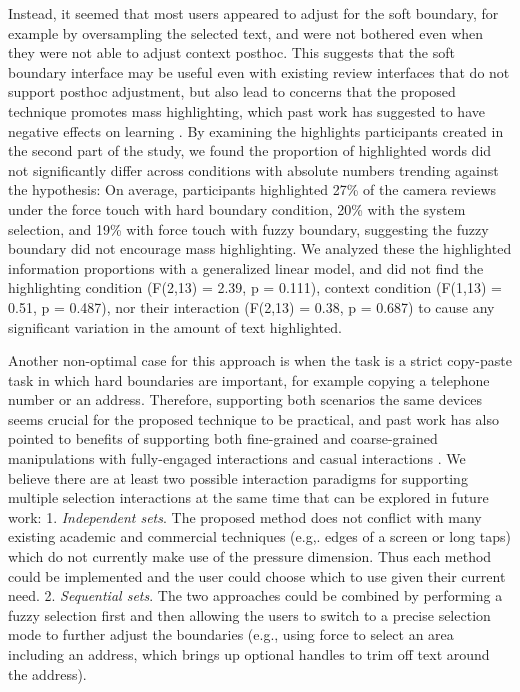 Instead, it seemed that most users appeared to adjust for the soft boundary, for example by oversampling the selected text, and were not bothered even when they were not able to adjust context posthoc.  This suggests that the soft boundary interface may be useful even with existing review interfaces that do not support posthoc adjustment, but also lead to concerns that the proposed technique promotes mass highlighting, which past work has suggested to have negative effects on learning \cite{peterson1991cognitive}. By examining the highlights participants created in the second part of the study, we found the proportion of highlighted words did not significantly differ across conditions with absolute numbers trending against the hypothesis: On average, participants highlighted 27\% of the camera reviews under the force touch with hard boundary condition, 20\% with the system selection, and 19\% with force touch with fuzzy boundary, suggesting the fuzzy boundary did not encourage mass highlighting. We analyzed these the highlighted information proportions with a generalized linear model, and did not find the highlighting condition (F(2,13) = 2.39, p = 0.111), context condition (F(1,13) = 0.51, p = 0.487), nor their interaction (F(2,13) = 0.38, p = 0.687) to cause any significant variation in the amount of text highlighted. 

Another non-optimal case for this approach is when the task is a strict copy-paste task in which hard boundaries are important, for example copying a telephone number or an address.  
 Therefore, supporting both scenarios the same devices seems crucial for the proposed technique to be practical, and
  past work has also pointed to benefits of supporting both fine-grained and coarse-grained manipulations with fully-engaged interactions and casual interactions \cite{pohl2013focused}.
 We believe there are at least two possible interaction paradigms for supporting multiple selection interactions at the same time that can be explored in future work: 1. \emph{Independent sets}. The proposed method does not conflict with many existing academic and commercial techniques (e.g,. edges of a screen\cite{chen2014bezelcopy} or long taps) which do not currently make use of the pressure dimension. Thus each method could be implemented and the user could choose which to use given their current need. 2. \emph{Sequential sets}. The two approaches could be combined by performing a fuzzy selection first and then allowing the users to switch to a precise selection mode to further adjust the boundaries (e.g., using force to select an area including an address, which brings up optional handles to trim off text around the address).


